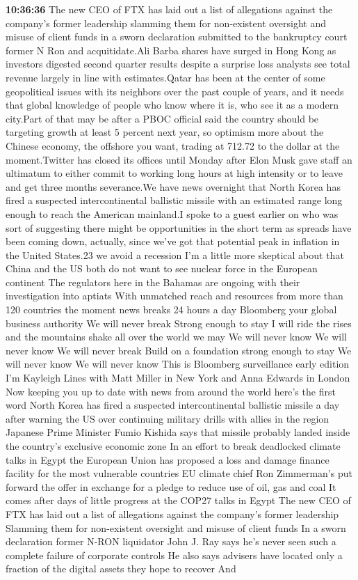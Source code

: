 \documentclass{article}%
\begin{document}
\textbf{10:36:36}%
\newline%
The new CEO of FTX has laid out a list of allegations against the company's former leadership slamming them for non{-}existent oversight and misuse of client funds in a sworn declaration submitted to the bankruptcy court former N Ron and acquitidate.Ali Barba shares have surged in Hong Kong as investors digested second quarter results despite a surprise loss analysts see total revenue largely in line with estimates.Qatar has been at the center of some geopolitical issues with its neighbors over the past couple of years, and it needs that global knowledge of people who know where it is, who see it as a modern city.Part of that may be after a PBOC official said the country should be targeting growth at least 5 percent next year, so optimism more about the Chinese economy, the offshore you want, trading at 712.72 to the dollar at the moment.Twitter has closed its offices until Monday after Elon Musk gave staff an ultimatum to either commit to working long hours at high intensity or to leave and get three months severance.We have news overnight that North Korea has fired a suspected intercontinental ballistic missile with an estimated range long enough to reach the American mainland.I spoke to a guest earlier on who was sort of suggesting there might be opportunities in the short term as spreads have been coming down, actually, since we've got that potential peak in inflation in the United States.23 we avoid a recession I'm a little more skeptical about that China and the US both do not want to see nuclear force in the European continent The regulators here in the Bahamas are ongoing with their investigation into aptiats With unmatched reach and resources from more than 120 countries the moment news breaks 24 hours a day Bloomberg your global business authority We will never break Strong enough to stay I will ride the rises and the mountains shake all over the world we may We will never know We will never know We will never break Build on a foundation strong enough to stay We will never know We will never know This is Bloomberg surveillance early edition I'm Kayleigh Lines with Matt Miller in New York and Anna Edwards in London Now keeping you up to date with news from around the world here's the first word North Korea has fired a suspected intercontinental ballistic missile a day after warning the US over continuing military drills with allies in the region Japanese Prime Minister Fumio Kishida says that missile probably landed inside the country's exclusive economic zone In an effort to break deadlocked climate talks in Egypt the European Union has proposed a loss and damage finance facility for the most vulnerable countries EU climate chief Ron Zimmerman's put forward the offer in exchange for a pledge to reduce use of oil, gas and coal It comes after days of little progress at the COP27 talks in Egypt The new CEO of FTX has laid out a list of allegations against the company's former leadership Slamming them for non{-}existent oversight and misuse of client funds In a sworn declaration former N{-}RON liquidator John J. Ray says he's never seen such a complete failure of corporate controls He also says advisers have located only a fraction of the digital assets they hope to recover And 
\end{document}
